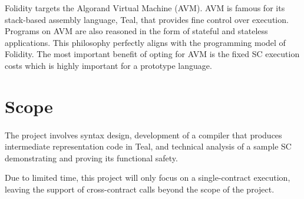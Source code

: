 \documentclass[10pt, a4paper]{article}
\begin{document}
Folidity targets the Algorand Virtual Machine (AVM). AVM is famous for its stack-based assembly language, Teal, that provides fine control over execution. Programs on AVM are also reasoned in the form of stateful and stateless applications. This philosophy perfectly aligns with the programming model of Folidity. The most important benefit of opting for AVM is the fixed SC execution costs which is highly important for a prototype language.

\section*{Scope}
\paragraph{}
The project involves syntax design, development of a compiler that produces intermediate representation code in Teal, and technical analysis of a sample SC demonstrating and proving its functional safety.

Due to limited time, this project will only focus on a single-contract execution, leaving the support of cross-contract calls beyond the scope of the project.
\end{document}
